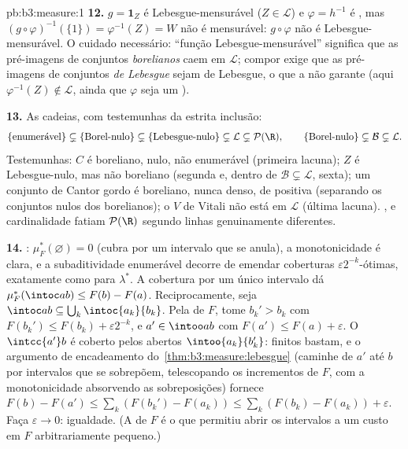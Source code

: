 \begin{solution}{pb:b3:measure:1}
\textbf{12.} $g = \mathbf 1_Z$ é Lebesgue-mensurável ($Z \in
\mathcal L$) e $\varphi = h^{-1}$ é , mas
$(g\circ\varphi)^{-1}(\{1\}) = \varphi^{-1}(Z) = W$ não é
mensurável: $g \circ \varphi$ não é Lebesgue-mensurável. O
cuidado necessário: ``função Lebesgue-mensurável'' significa que as pré-imagens
de conjuntos \emph{borelianos} caem em $\mathcal L$; compor exige que as
pré-imagens de conjuntos \emph{de Lebesgue} sejam de Lebesgue, o que
a  não garante (aqui $\varphi^{-1}(Z) \notin
\mathcal L$, ainda que $\varphi$ seja um ).

\textbf{13.} As cadeias, com testemunhas da estrita inclusão:
\[
\{\text{enumerável}\} \subsetneq \{\text{Borel-nulo}\}
\subsetneq \{\text{Lebesgue-nulo}\} \subsetneq \mathcal L
\subsetneq \mathcal P(\R),
\qquad
\{\text{Borel-nulo}\} \subsetneq \mathcal B \subsetneq
\mathcal L .
\]
Testemunhas: $C$ é boreliano, nulo, não enumerável (primeira lacuna); $Z$ é
Lebesgue-nulo, mas não boreliano (segunda e, dentro de $\mathcal B
\subsetneq \mathcal L$, sexta); um conjunto de Cantor gordo é boreliano,
nunca denso, de  positiva (separando os conjuntos nulos dos
borelianos); o $V$ de Vitali não está em $\mathcal L$ (última lacuna).
,  e cardinalidade fatiam $\mathcal P(\R)$ segundo
linhas genuinamente diferentes.

\textbf{14.} : $\mu_F^*(\varnothing) = 0$ (cubra
por um intervalo que se anula), a monotonicidade é clara, e a subaditividade
enumerável decorre de emendar coberturas $\varepsilon2^{-k}$-ótimas,
exatamente como para $\lambda^*$. A cobertura por um único intervalo
dá $\mu_F^*(\intoc ab) \leq F(b) - F(a)$. Reciprocamente, seja
$\intoc ab \subseteq \bigcup_k\intoc{a_k}{b_k}$. Pela 
de $F$, tome $b_k' > b_k$ com $F(b_k') \leq F(b_k) +
\varepsilon2^{-k}$, e $a' \in \intoo ab$ com $F(a') \leq
F(a) + \varepsilon$. O  $\intcc{a'}b$ é coberto pelos
abertos $\intoo{a_k}{b_k'}$: finitos bastam, e o
argumento de encadeamento do~\cref{thm:b3:measure:lebesgue} (caminhe de
$a'$ até $b$ por intervalos que se sobrepõem, telescopando
os incrementos de $F$, com a monotonicidade absorvendo as sobreposições) fornece $F(b)
- F(a') \leq \sum_k(F(b_k') - F(a_k)) \leq \sum_k(F(b_k) -
F(a_k)) + \varepsilon$. Faça $\varepsilon \to 0$: igualdade.
(A  de $F$ é o que permitiu abrir os intervalos a um
custo em $F$ arbitrariamente pequeno.)


\end{solution}
